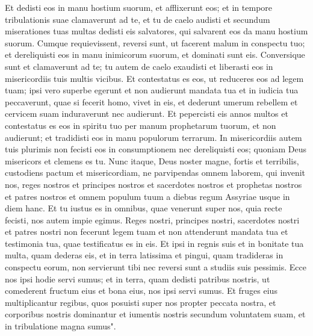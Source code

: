 \begin{biblechapter}
\verse Et dedisti eos in manu hostium suorum, et afflixerunt eos; et in tempore tribulationis suae clamaverunt ad te, et tu de caelo audisti et secundum miserationes tuas multas dedisti eis salvatores, qui salvarent eos da manu hostium suorum. 
\verse Cumque requievissent, reversi sunt, ut facerent malum in conspectu tuo; et dereliquisti eos in manu inimicorum suorum, et dominati sunt eis. Conversique sunt et clamaverunt ad te; tu autem de caelo exaudisti et liberasti eos in misericordiis tuis multis vicibus. 
\verse Et contestatus es eos, ut reduceres eos ad legem tuam; ipsi vero superbe egerunt et non audierunt mandata tua et in iudicia tua peccaverunt, quae si fecerit homo, vivet in eis, et dederunt umerum rebellem et cervicem suam induraverunt nec audierunt. 
\verse Et pepercisti eis annos multos et contestatus es eos in spiritu tuo per manum prophetarum tuorum, et non audierunt; et tradidisti eos in manu populorum terrarum. 
\verse In misericordiis autem tuis plurimis non fecisti eos in consumptionem nec dereliquisti eos; quoniam Deus misericors et clemens es tu. 
\verse Nunc itaque, Deus noster magne, fortis et terribilis, custodiens pactum et misericordiam, ne parvipendas omnem laborem, qui invenit nos, reges nostros et principes nostros et sacerdotes nostros et prophetas nostros et patres nostros et omnem populum tuum a diebus regum Assyriae usque in diem hanc. 
\verse Et tu iustus es in omnibus, quae venerunt super nos, quia recte fecisti, nos autem impie egimus. 
\verse Reges nostri, principes nostri, sacerdotes nostri et patres nostri non fecerunt legem tuam et non attenderunt mandata tua et testimonia tua, quae testificatus es in eis. 
\verse Et ipsi in regnis suis et in bonitate tua multa, quam dederas eis, et in terra latissima et pingui, quam tradideras in conspectu eorum, non servierunt tibi nec reversi sunt a studiis suis pessimis. 
\verse Ecce nos ipsi hodie servi sumus; et in terra, quam dedisti patribus nostris, ut comederent fructum eius et bona eius, nos ipsi servi sumus. 
\verse Et fruges eius multiplicantur regibus, quos posuisti super nos propter peccata nostra, et corporibus nostris dominantur et iumentis nostris secundum voluntatem suam, et in tribulatione magna sumus". 
\end{biblechapter}

